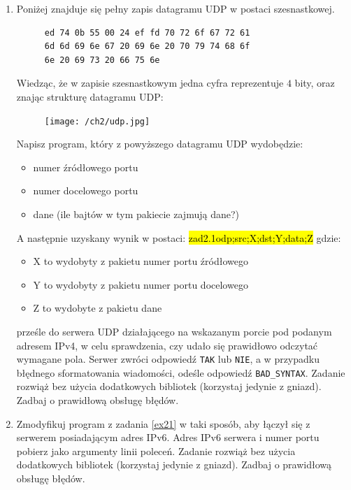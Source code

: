 \documentclass{article}
\newcommand{\hlc}[2][shadecolor]{ 	{\sethlcolor{#1} \hl{#2}} }
\begin{document}
\begin{enumerate}[label=\textbf{2.\arabic*}]\setlength{\itemsep}{1em}
    \item \label{ex21} Poniżej znajduje się pełny zapis datagramu UDP w postaci szesnastkowej. \\

\begin{figure}[h!t!p!]
\centering
\begin{BVerbatim}
ed 74 0b 55 00 24 ef fd 70 72 6f 67 72 61
6d 6d 69 6e 67 20 69 6e 20 70 79 74 68 6f 
6e 20 69 73 20 66 75 6e
\end{BVerbatim}
\end{figure}

\noindent  Wiedząc, że w zapisie szesnastkowym jedna cyfra reprezentuje $4$ bity, oraz znając strukturę datagramu UDP: 

\begin{figure}[ht!]
\centering
\texttt{[image: /ch2/udp.jpg]}
\end{figure}

\noindent Napisz program, który z powyższego datagramu UDP wydobędzie: 

\begin{itemize}
\item numer źródłowego portu
\item numer docelowego portu
\item dane (ile bajtów w tym pakiecie zajmują dane?)
\end{itemize}

\noindent A następnie uzyskany wynik w postaci: \hlc[shadecolor]{ zad2.1odp;src;X;dst;Y;data;Z } gdzie:

\begin{itemize}
\item X to wydobyty z pakietu numer portu źródłowego
\item Y to wydobyty z pakietu numer portu docelowego
\item Z to wydobyte z pakietu dane 
\end{itemize}

 prześle do serwera UDP działającego na wskazanym porcie pod podanym adresem IPv4, w celu sprawdzenia, czy udało się prawidłowo odczytać wymagane pola. Serwer zwróci odpowiedź \texttt{TAK} lub \texttt{NIE}, a w przypadku błędnego sformatowania wiadomości, odeśle odpowiedź \texttt{BAD\_SYNTAX}.  Zadanie rozwiąż bez użycia dodatkowych bibliotek (korzystaj jedynie z gniazd). Zadbaj o prawidłową obsługę błędów. 

  \item Zmodyfikuj program z zadania \ref{ex21} w taki sposób,  aby łączył się z serwerem posiadającym adres IPv6.  Adres IPv6 serwera i numer portu pobierz jako argumenty linii poleceń. Zadanie rozwiąż bez użycia dodatkowych bibliotek (korzystaj jedynie z gniazd). Zadbaj o prawidłową obsługę błędów. 
 


\end{enumerate}
\end{document}
